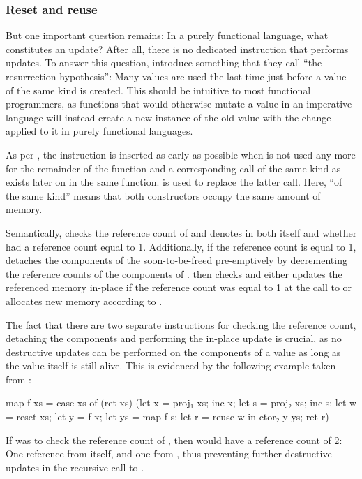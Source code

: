 \subsubsection{Reset and reuse}
But one important question remains: In a purely functional language, what constitutes an update? After all, there is no dedicated instruction that performs updates. To answer this question, \cite{ullrich_counting_2020} introduce something that they call ``the resurrection hypothesis'': Many values are used the last time just before a value of the same kind is created. This should be intuitive to most functional programmers, as functions that would otherwise mutate a value in an imperative language will instead create a new instance of the old value with the change applied to it in purely functional languages.

As per \cite{ullrich_counting_2020}, the  instruction is inserted as early as possible when  is not used any more for the remainder of the function and a corresponding  call of the same kind as  exists later on in the same function.  is used to replace the latter  call. Here, ``of the same kind'' means that both constructors occupy the same amount of memory.

Semantically,  checks the reference count of  and denotes in  both  itself and whether  had a reference count equal to 1. Additionally, if the reference count is equal to 1,  detaches the components of the soon-to-be-freed  pre-emptively by decrementing the reference counts of the components of .  then checks  and either updates the referenced memory in-place if the reference count was equal to 1 at the call to  or allocates new memory according to .

The fact that there are two separate instructions for checking the reference count, detaching the components and performing the in-place update is crucial, as no destructive updates can be performed on the components of a value as long as the value itself is still alive. This is evidenced by the following example taken from \cite{ullrich_counting_2020}:\\
\begin{ifcode}
map f xs = case xs of
  (ret xs)
  (let x = proj₁ xs;
   inc x;
   let s = proj₂ xs;
   inc s;
   let w = reset xs;
   let y = f x;
   let ys = map f s;
   let r = reuse w in ctor₂ y ys;
   ret r)
\end{ifcode}
If  was to check the reference count of , then  would have a reference count of 2: One reference from  itself, and one from , thus preventing further destructive updates in the recursive call to .

